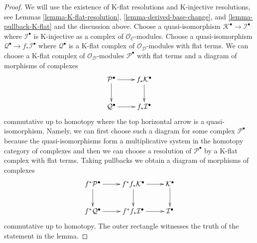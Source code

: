 \documentclass[10pt,a4paper]{amsart}
\theoremstyle{plain}
\theoremstyle{definition}
\theoremstyle{remark}
\numberwithin{equation}{subsection}
\begin{document}
\begin{proof}
We will use the existence of K-flat resolutions and
K-injective resolutions, see Lemmas
\ref{lemma-K-flat-resolution}, \ref{lemma-derived-base-change}, and
\ref{lemma-pullback-K-flat} and the discussion above.
Choose a quasi-isomorphism
$\mathcal{K}^\bullet \to \mathcal{I}^\bullet$ where $\mathcal{I}^\bullet$
is K-injective as a complex of $\mathcal{O}_\mathcal{C}$-modules.
Choose a quasi-isomorphism $\mathcal{Q}^\bullet \to f_*\mathcal{I}^\bullet$
where $\mathcal{Q}^\bullet$ is a K-flat complex of
$\mathcal{O}_\mathcal{D}$-modules with flat terms.
We can choose a K-flat complex of
$\mathcal{O}_\mathcal{D}$-modules $\mathcal{P}^\bullet$ with flat terms
and a diagram of morphisms of complexes
$$
\xymatrix{
\mathcal{P}^\bullet \ar[r] \ar[d] &
f_*\mathcal{K}^\bullet \ar[d] \\
\mathcal{Q}^\bullet \ar[r] & f_*\mathcal{I}^\bullet
}
$$
commutative up to homotopy where the top horizontal arrow
is a quasi-isomorphism. Namely, we can first choose such a
diagram for some complex $\mathcal{P}^\bullet$ because
the quasi-isomorphisms form a multiplicative system in
the homotopy category of complexes and then we can choose
a resolution of $\mathcal{P}^\bullet$ by a K-flat complex with flat terms.
Taking pullbacks we obtain a diagram of morphisms of complexes
$$
\xymatrix{
f^*\mathcal{P}^\bullet \ar[r] \ar[d] &
f^*f_*\mathcal{K}^\bullet \ar[d] \ar[r] &
\mathcal{K}^\bullet \ar[d] \\
f^*\mathcal{Q}^\bullet \ar[r] &
f^*f_*\mathcal{I}^\bullet \ar[r] &
\mathcal{I}^\bullet
}
$$
commutative up to homotopy. The outer rectangle witnesses the
truth of the statement in the lemma.
\end{proof}
\end{document}
